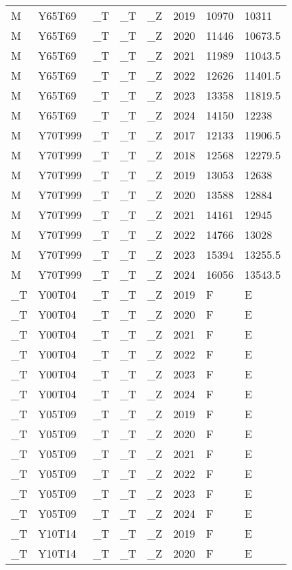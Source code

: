 \begin{longtable}[t]{llllllll}
M & Y65T69 & \_T & \_T & \_Z & 2019 & 10970 & 10311\\
M & Y65T69 & \_T & \_T & \_Z & 2020 & 11446 & 10673.5\\
M & Y65T69 & \_T & \_T & \_Z & 2021 & 11989 & 11043.5\\
\addlinespace
M & Y65T69 & \_T & \_T & \_Z & 2022 & 12626 & 11401.5\\
M & Y65T69 & \_T & \_T & \_Z & 2023 & 13358 & 11819.5\\
M & Y65T69 & \_T & \_T & \_Z & 2024 & 14150 & 12238\\
M & Y70T999 & \_T & \_T & \_Z & 2017 & 12133 & 11906.5\\
M & Y70T999 & \_T & \_T & \_Z & 2018 & 12568 & 12279.5\\
\addlinespace
M & Y70T999 & \_T & \_T & \_Z & 2019 & 13053 & 12638\\
M & Y70T999 & \_T & \_T & \_Z & 2020 & 13588 & 12884\\
M & Y70T999 & \_T & \_T & \_Z & 2021 & 14161 & 12945\\
M & Y70T999 & \_T & \_T & \_Z & 2022 & 14766 & 13028\\
M & Y70T999 & \_T & \_T & \_Z & 2023 & 15394 & 13255.5\\
\addlinespace
M & Y70T999 & \_T & \_T & \_Z & 2024 & 16056 & 13543.5\\
\_T & Y00T04 & \_T & \_T & \_Z & 2019 & F & E\\
\_T & Y00T04 & \_T & \_T & \_Z & 2020 & F & E\\
\_T & Y00T04 & \_T & \_T & \_Z & 2021 & F & E\\
\_T & Y00T04 & \_T & \_T & \_Z & 2022 & F & E\\
\addlinespace
\_T & Y00T04 & \_T & \_T & \_Z & 2023 & F & E\\
\_T & Y00T04 & \_T & \_T & \_Z & 2024 & F & E\\
\_T & Y05T09 & \_T & \_T & \_Z & 2019 & F & E\\
\_T & Y05T09 & \_T & \_T & \_Z & 2020 & F & E\\
\_T & Y05T09 & \_T & \_T & \_Z & 2021 & F & E\\
\addlinespace
\_T & Y05T09 & \_T & \_T & \_Z & 2022 & F & E\\
\_T & Y05T09 & \_T & \_T & \_Z & 2023 & F & E\\
\_T & Y05T09 & \_T & \_T & \_Z & 2024 & F & E\\
\_T & Y10T14 & \_T & \_T & \_Z & 2019 & F & E\\
\_T & Y10T14 & \_T & \_T & \_Z & 2020 & F & E\\

\end{longtable}
